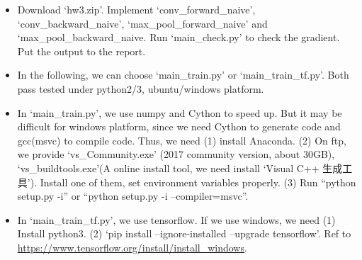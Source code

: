 \documentclass[12pt]{article}
\begin{document}
\begin{itemize}
	\item Download `hw3.zip'. Implement `conv\_forward\_naive', `conv\_backward\_naive', `max\_pool\_forward\_naive' and `max\_pool\_backward\_naive. Run `main\_check.py' to check the gradient. Put the output to the report. 
	\item In the following, we can choose `main\_train.py' or `main\_train\_tf.py'. Both pass tested under python2/3, ubuntu/windows platform. 
	\item In `main\_train.py',   we use  numpy and Cython to speed up. But it may be difficult for windows platform, since we need Cython to generate code and gcc(msvc) to compile code. Thus, we need (1) install Anaconda. (2) On ftp, we provide  `vs\_Community.exe' (2017 community version, about 30GB), `vs\_buildtools.exe'(A online install tool, we need install `Visual C++ 生成工具'). Install one of them, set environment variables properly. (3) Run ``python setup.py -i'' or ``python setup.py -i --compiler=msvc''. 
	\item In `main\_train\_tf.py', we use tensorflow. If we use windows, we need (1) Install python3. (2) `pip install --ignore-installed --upgrade tensorflow'. Ref to \url{https://www.tensorflow.org/install/install_windows}. 

\end{itemize}
\end{document}
